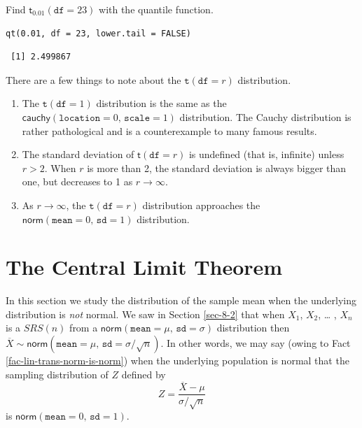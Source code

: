 \documentclass[captions=tableheading]{scrbook}
\begin{document}
\begin{example}
Find \(\mathsf{t}{}_{0.01}(\mathtt{df}=23)\) with the quantile function.
\end{example}


\begin{verbatim}
qt(0.01, df = 23, lower.tail = FALSE)
\end{verbatim}

\begin{verbatim}
 [1] 2.499867
\end{verbatim}

\begin{rem}
There are a few things to note about the \(\mathtt{t}(\mathtt{df}=r)\) distribution.
\begin{enumerate}
\item The \(\mathtt{t}(\mathtt{df}=1)\) distribution is the same as the \(\mathsf{cauchy}(\mathtt{location}=0,\,\mathtt{scale}=1)\) distribution. The Cauchy distribution is rather pathological and is a counterexample to many famous results.
\item The standard deviation of \(\mathsf{t}(\mathtt{df}=r)\) is undefined (that is, infinite) unless \(r>2\). When \(r\) is more than 2, the standard deviation is always bigger than one, but decreases to 1 as \(r\to\infty\).
\item As \(r\to\infty\), the \(\mathtt{t}(\mathtt{df}=r)\) distribution approaches the \(\mathsf{norm}(\mathtt{mean}=0,\,\mathtt{sd}=1)\) distribution.
\end{enumerate}

\end{rem}
\section{The Central Limit Theorem}
\label{sec-8-3}
\label{sec-Central-Limit-Theorem}


In this section we study the distribution of the sample mean when the underlying distribution is \emph{not} normal. We saw in Section \ref{sec-8-2} that when \(X_{1}\), \(X_{2}\), \ldots{} , \(X_{n}\) is a \(SRS(n)\) from a \(\mathsf{norm}(\mathtt{mean}=\mu,\,\mathtt{sd}=\sigma)\) distribution then \(\overline{X}\sim\mathsf{norm}(\mathtt{mean}=\mu,\,\mathtt{sd}=\sigma/\sqrt{n})\). In other words, we may say (owing to Fact \ref{fac-lin-trans-norm-is-norm}) when the underlying population is normal that the sampling distribution of \(Z\) defined by
\begin{equation}
Z=\frac{\overline{X}-\mu}{\sigma/\sqrt{n}}
\end{equation}
is \(\mathsf{norm}(\mathtt{mean}=0,\,\mathtt{sd}=1)\). 
\end{document}
